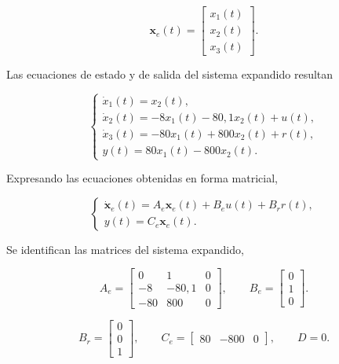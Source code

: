 \documentclass[10pt]{article}
\begin{document}
\begin{equation}
    \mathbf{x}_e(t)=
    \begin{bmatrix}
        x_1(t)\\
        x_2(t)\\
        x_3(t)
    \end{bmatrix}.
\end{equation}

Las ecuaciones de estado y de salida del sistema
expandido resultan

\begin{equation}
    \boxed{
        \begin{cases}
            \dot{x}_1(t)=x_2(t),\\
            \dot{x}_2(t)=-8x_1(t)-80{,}1x_2(t)+u(t),\\
            \dot{x}_3(t)=-80x_1(t)+800x_2(t)+r(t),\\
            y(t)=80x_1(t)-800x_2(t).
        \end{cases}
    }
\end{equation}

Expresando las ecuaciones obtenidas en forma matricial,

\begin{equation}
    \begin{cases}
        \dot{\mathbf{x}}_e(t)=
        A_e\mathbf{x}_e(t)+B_eu(t)+B_rr(t),\\
        y(t)=C_e\mathbf{x}_e(t).
    \end{cases}
\end{equation}

Se identifican las matrices del sistema expandido,

\begin{equation}
    A_e=
    \begin{bmatrix}
        0 & 1 & 0\\
        -8 & -80{,}1 & 0\\
        -80 & 800 & 0
    \end{bmatrix},
    \qquad
    B_e=
    \begin{bmatrix}
        0\\
        1\\
        0
    \end{bmatrix}.
\end{equation}

\begin{equation}
    B_r=
    \begin{bmatrix}
        0\\
        0\\
        1
    \end{bmatrix},
    \qquad
    C_e=
    \begin{bmatrix}
        80 & -800 & 0
    \end{bmatrix},
    \qquad D=0.
\end{equation}
\end{document}
